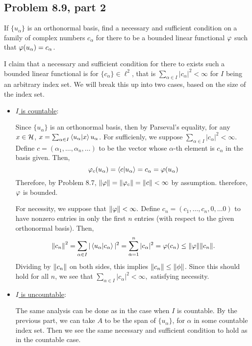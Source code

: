 \newpage
\subsection{Problem 8.9, part 2}
If $\{ u_\alpha\}$ is an orthonormal basis, find a necessary and sufficient condition on a family of complex numbers $c_\alpha$ for there to be a bounded linear functional $\varphi$ such that $\varphi(u_\alpha) = c_\alpha$.
\partbreak
\begin{solution}

    I claim that a necessary and sufficient condition for there to exists such a bounded linear functional is for $\{ c_\alpha \} \in \ell^2$, that is $\sum_{\alpha \in I}|c_\alpha|^2 < \infty$ for $I$ being an arbitrary index set. We will break this up into two cases, based on the size of the index set.

    \begin{itemize}
        \item \underline{$I$ is countable}:

        \hop
        Since $\{u_\alpha\}$ is an orthonormal basis, then by Parseval's equality, for any $x \in \mathcal{H}$, $x = \sum_{\alpha \in I} \braket{u_\alpha}{x}u_\alpha$. For sufficienly, we suppose $\sum_{\alpha \in I} |c_\alpha|^2 < \infty$. Define $c = (\alpha_1, \dots, \alpha_n, \dots)$ to be the vector whose $\alpha$-th element is $c_{\alpha}$ in the basis given. Then,
        \[\varphi_{c}(u_\alpha) = \braket{c}{u_\alpha} = c_\alpha = \varphi(u_\alpha)\]
        Therefore, by Problem 8.7, $\norm{\varphi} = \norm{\varphi_c} = \norm{c} < \infty$ by assumption. therefore, $\varphi$ is bounded.  \par
        
        \jump
        For necessity, we suppose that $\norm{\varphi} < \infty.$ Define $c_n = (c_1, \dots, c_n, 0, \dots 0)$ to have nonzero entries in only the first $n$ entries (with respect to the given orthonormal basis). Then,
        \[\norm{c_n}^2 = \sum_{\alpha \in I} |\braket{u_\alpha}{c_\alpha}|^2 = \sum_{\alpha =1}^n |{c_\alpha}|^2 = \varphi(c_n) \leq \norm{\varphi}\norm{c_n}.\]
        Dividing by $\norm{c_n}$ on both sides, this implies $\norm{c_n} \leq \norm{\phi}$. Since this should hold for all $n$, we see that $\sum_{\alpha \in I} |c_{\alpha}|^2 < \infty,$ satisfying necessity. 

        \item \underline{$I$ is uncountable}:

        \hop
        The same analysis can be done as in the case when $I$ is countable. By the previous part, we can take $A$ to be the span of $\{u_\alpha\}$, for $\alpha$ in some countable index set. Then we see the same necessary and sufficient condition to hold as in the countable case. 
    \end{itemize}
\end{solution}
